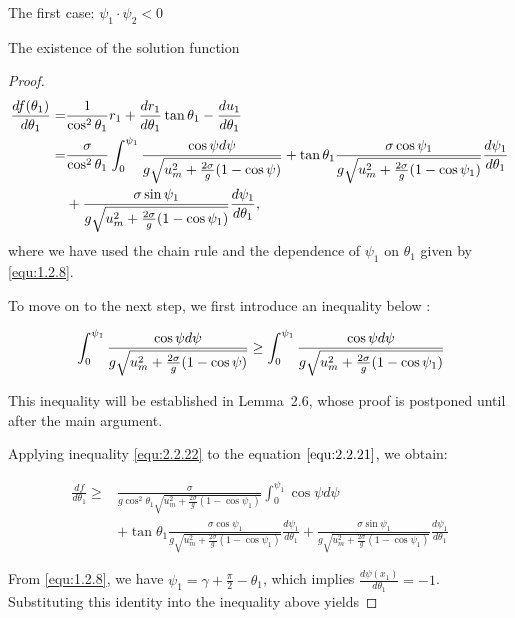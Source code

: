 \documentclass[letterpaper,reqno,10pt,twoside]{amsart}
\theoremstyle{definition}
\theoremstyle{remark}
\begin{document}
\begin{section}{The first case: $\psi_1\cdot \psi_2<0$ }
\begin{subsection}{The existence of the solution function}
\begin{proof}
        \begin{align}
            \frac{df(\theta_1)}{d\theta_1}=&\frac{1}{\cos^{2}\theta_{1}}r_1+\frac{dr_1}{d\theta_1}\tan\theta_{1}-\frac{du_1}{d\theta_1} \notag\\
            =&\frac{\sigma}{\cos^{2}\theta_1}\int_{0}^{\psi_1}\frac{\cos\psi d\psi}{g\sqrt{u_{m}^{2}+\frac{2\sigma}{g}(1-\cos\psi)}}+\tan\theta_{1}\frac{\sigma\cos\psi_1}{g\sqrt{u_m^{2}+\frac{2\sigma}{g}(1-\cos\psi_1)}}\frac{d\psi_1}{d\theta_{1}} \notag\\
            &+\frac{\sigma\sin\psi_1}{g\sqrt{u_{m}^{2}+\frac{2\sigma}{g}(1-\cos\psi_1)}}\frac{d\psi_1}{d\theta_{1}} \label{equ:2.2.21},
        \end{align}
        where we have used the chain rule and the dependence of $\psi_{1}$ on $\theta_{1}$ given by \eqref{equ:1.2.8}.
        
        To move on to the next step, we first introduce an inequality below :

        \begin{equation}{\label{equ:2.2.22}}
        \int_{0}^{\psi_1}\frac{\cos\psi d\psi}{g\sqrt{u_{m}^{2}+\frac{2\sigma}{g}(1-\cos\psi)}}\geq \int_{0}^{\psi_1} \frac{\cos\psi d\psi}{g\sqrt{u_{m}^{2}+\frac{2\sigma}{g}(1-\cos\psi_1)}}
        \end{equation}

        \noindent This inequality will be established in Lemma~2.6, whose proof is postponed until after the main argument.
        
          Applying inequality \eqref{equ:2.2.22} to the equation $\eqref{equ:2.2.21}$, we obtain:

        \begin{align*}
            \frac{df}{d\theta_1} \geq &\frac{\sigma}{g\cos^{2}\theta_1\sqrt{u_m^{2}+\frac{2\sigma}{g}(1-\cos\psi_1)}}\int_{0}^{\psi_1} \cos\psi d\psi \\
            &+\tan\theta_1\frac{\sigma\cos\psi_1}{g\sqrt{u_{m}^{2}+\frac{2\sigma}{g}(1-\cos\psi_1)}}\frac{d\psi_1}{d\theta_{1}}+\frac{\sigma\sin\psi_1}{g\sqrt{u_{m}^{2}+\frac{2\sigma}{g}(1-\cos\psi_1)}}\frac{d\psi_1}{d\theta_1} 
        \end{align*}

          From \eqref{equ:1.2.8}, we have $\psi_1=\gamma+\frac{\pi}{2}-\theta_1$, which implies $\frac{d\psi(x_1)}{d\theta_{1}}=-1$. Substituting this identity into the inequality above yields


\end{proof}
\end{subsection}
\end{section}
\end{document}
